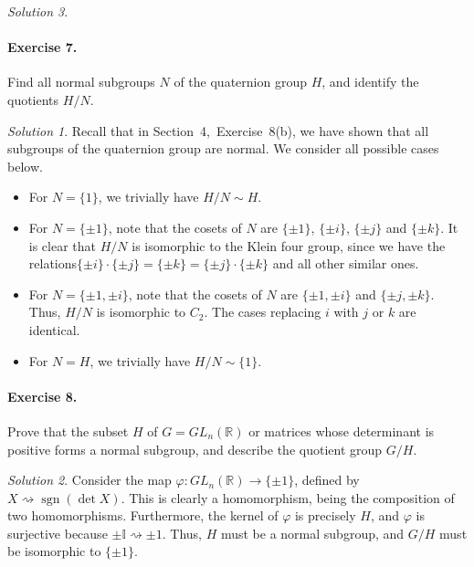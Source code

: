 \documentclass[11pt]{report}
\def\R{\mathbb{R}}
\DeclareMathOperator\sgn{sgn}
\theoremstyle{remark}
\newtheorem*{solution}{Solution}
\begin{document}
\begin{solution}
    \paragraph{Exercise 7.} Find all normal subgroups $N$ of the quaternion group
    $H$, and identify the quotients $H / N$.
    \begin{solution}
        Recall that in Section~4,~Exercise~8(b), we have shown that all subgroups of
        the quaternion group are normal. We consider all possible cases below.
        \begin{itemize}
            \itemsep0em
            \item For $N = \{1\}$, we trivially have $H / N \sim H$.

            \item For $N = \{\pm 1\}$, note that the cosets of $N$ are $\{\pm 1\}$,
            $\{\pm i\}$, $\{\pm j\}$ and $\{\pm k\}$. It is clear that $H / N$ is
            isomorphic to the Klein four group, since we have the relations$\{\pm
            i\}\cdot \{\pm j\} = \{\pm k\} = \{\pm j\}\cdot \{\pm k\}$ and all other
            similar ones.

            \item For $N = \{\pm 1, \pm i\}$, note that the cosets of $N$ are $\{\pm
            1, \pm i\}$ and $\{\pm j, \pm k\}$. Thus, $H / N$ is isomorphic to $C_2$.
            The cases replacing $i$ with $j$ or $k$ are identical.

            \item For $N = H$, we trivially have $H / N \sim \{1\}$.
        \end{itemize}
    \end{solution}
    
    \paragraph{Exercise 8.} Prove that the subset $H$ of $G = GL_n(\R)$ or matrices
    whose determinant is positive forms a normal subgroup, and describe the quotient
    group $G / H$.
    \begin{solution}
        Consider the map $\varphi\colon GL_n(\R) \to \{\pm 1\}$, defined by $X
        \rightsquigarrow \sgn(\det{X})$. This is clearly a homomorphism, being the
        composition of two homomorphisms. Furthermore, the kernel of $\varphi$ is
        precisely $H$, and $\varphi$ is surjective because $\pm \mathbb{I}
        \rightsquigarrow \pm 1$. Thus, $H$ must be a normal subgroup, and $G / H$
        must be isomorphic to $\{\pm 1\}$.
    \end{solution}


\end{solution}
\end{document}
